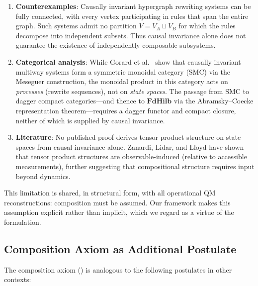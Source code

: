 \documentclass[11pt,a4paper]{article}
\theoremstyle{definition}
\theoremstyle{remark}
\begin{document}
\begin{enumerate}
\item \textbf{Counterexamples}: Causally invariant hypergraph rewriting
  systems can be fully connected, with every vertex participating in
  rules that span the entire graph. Such systems admit no partition
  $V = V_A \sqcup V_B$ for which the rules decompose into independent
  subsets. Thus causal invariance alone does not guarantee the existence
  of independently composable subsystems.

\item \textbf{Categorical analysis}: While Gorard et al.\ \cite{gorard2021categorical} show that
  causally invariant multiway systems form a symmetric monoidal category
  (SMC) via the Meseguer \cite{meseguer1992conditional} construction, the monoidal product in this
  category acts on \textit{processes} (rewrite sequences), not on
  \textit{state spaces}. The passage from SMC to dagger compact
  categories---and thence to $\mathbf{FdHilb}$ via the Abramsky--Coecke
  \cite{abramsky2004categorical} representation theorem---requires a dagger functor and compact closure,
  neither of which is supplied by causal invariance.

\item \textbf{Literature}: No published proof derives tensor product
  structure on state spaces from causal invariance alone. Zanardi, Lidar,
  and Lloyd \cite{zanardi2004quantum} have shown that tensor product structures are
  observable-induced (relative to accessible measurements), further
  suggesting that compositional structure requires input beyond dynamics.
\end{enumerate}

This limitation is shared, in structural form, with all operational QM
reconstructions: composition must be assumed. Our framework makes this
assumption explicit rather than implicit, which we regard as a virtue of
the formulation.

\subsection{Composition Axiom as Additional Postulate}

The composition axiom () is analogous to the
following postulates in other contexts:
\end{document}
